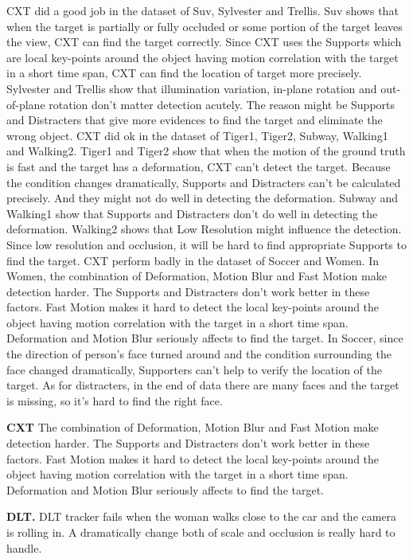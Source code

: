 \documentclass{acm_proc_article-sp}
\begin{document}
CXT did a good job in the dataset of Suv, Sylvester and Trellis.
Suv shows that when the target is partially or fully occluded or some portion of the target leaves the view, CXT can find the target correctly.
Since CXT uses the Supports which are local key-points around the object having motion correlation with the target in a short time span, CXT can find the location of target more precisely.
Sylvester and Trellis show that illumination variation, in-plane rotation and out-of-plane rotation don't matter detection acutely.
The reason might be Supports and Distracters that give more evidences to find the target and eliminate the wrong object.
CXT did ok in the dataset of Tiger1, Tiger2, Subway, Walking1 and Walking2.
Tiger1 and Tiger2 show that when the motion of the ground truth is fast and the target has a deformation, CXT can't detect the target.
Because the condition changes dramatically, Supports and Distracters can't be calculated precisely.
And they might not do well in detecting the deformation.
Subway and Walking1 show that Supports and Distracters don't do well in detecting the deformation.
Walking2 shows that Low Resolution might influence the detection. Since low resolution and occlusion, it will be hard to find appropriate Supports to find the target.
CXT perform badly in the dataset of Soccer and Women.
In Women, the combination of Deformation, Motion Blur and Fast Motion make detection harder.
The Supports and Distracters don't work better in these factors.
Fast Motion makes it hard to detect the local key-points around the object having motion correlation with the target in a short time span.
Deformation and Motion Blur seriously affects to find the target.
In Soccer, since the direction of person's face turned around and the condition surrounding the face changed dramatically, Supporters can't help to verify the location of the target.
As for distracters, in the end of data there are many faces and the target is missing, so it's hard to find the right face.

\textbf{CXT} The combination of Deformation, Motion Blur and Fast Motion make detection harder. The Supports and Distracters don't work better in these factors. Fast Motion makes it hard to detect the local key-points around the object having motion correlation with the target in a short time span. Deformation and Motion Blur seriously affects to find the target.

\textbf{DLT.} DLT tracker fails when the woman walks close to the car and the camera is rolling in. A dramatically change both of scale and occlusion is really hard to handle.
\end{document}
